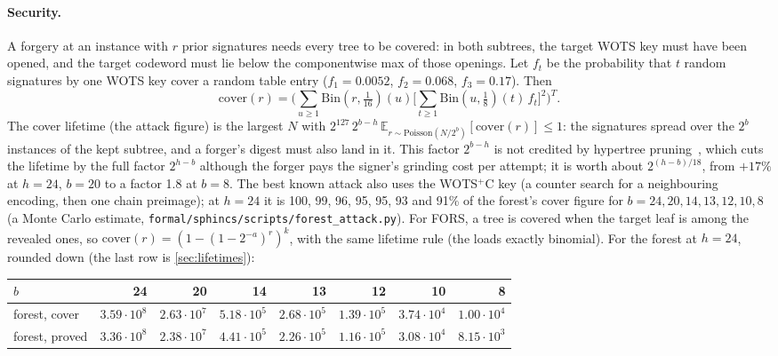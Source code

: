 \documentclass[11pt]{article}
\begin{document}
\paragraph{Security.} A forgery at an instance with $r$ prior signatures needs every tree to be covered: in both
subtrees, the target WOTS key must have been opened, and the target codeword must lie below the componentwise max of
those openings. Let $f_t$ be the probability that $t$ random signatures by one WOTS key cover a random table entry
($f_1=0.0052$, $f_2=0.068$, $f_3=0.17$). Then
\[
\mathrm{cover}(r)=\Big(\sum_{u\ge1}\mathrm{Bin}(r,\tfrac1{16})(u)\Big[\sum_{t\ge1}\mathrm{Bin}(u,\tfrac18)(t)\,f_t\Big]^2\Big)^T .
\]
The cover lifetime (the attack figure) is the largest $N$ with $2^{127}\,2^{b-h}\,\mathbb{E}_{r\sim\mathrm{Poisson}(N/2^b)}[\mathrm{cover}(r)]\le1$:
the signatures spread over the $2^b$ instances of the kept subtree, and a forger's digest must also land in it. This
factor $2^{b-h}$ is not credited by hypertree pruning~\cite{conduition}, which cuts the lifetime by the full factor
$2^{h-b}$ although the forger pays the signer's grinding cost per attempt; it is worth about $2^{(h-b)/18}$, from
$+17\%$ at $h=24$, $b=20$ to a factor 1.8 at $b=8$. The best known attack also uses the WOTS$^+$C key (a counter
search for a neighbouring encoding, then one chain preimage); at $h=24$ it is 100, 99, 96, 95, 95, 93 and 91\% of the
forest's cover figure for $b=24,20,14,13,12,10,8$ (a Monte Carlo estimate, \texttt{formal/sphincs/scripts/forest\_attack.py}). For FORS, a tree is covered when the target leaf
is among the revealed ones, so $\mathrm{cover}(r)=(1-(1-2^{-a})^r)^k$, with the same lifetime rule (the loads
exactly binomial). For the forest at $h=24$, rounded down (the last row is \cref{sec:lifetimes}):
\begin{center}
\setlength{\tabcolsep}{4.5pt}
\begin{tabular}{lrrrrrrr}
  \toprule
  $b$ & 24 & 20 & 14 & 13 & 12 & 10 & 8 \\
  \midrule
  forest, cover & $3.59\cdot10^8$ & $2.63\cdot10^7$ & $5.18\cdot10^5$ & $2.68\cdot10^5$ & $1.39\cdot10^5$ & $3.74\cdot10^4$ & $1.00\cdot10^4$ \\
  \midrule
  forest, proved & $3.36\cdot10^8$ & $2.38\cdot10^7$ & $4.41\cdot10^5$ & $2.26\cdot10^5$ & $1.16\cdot10^5$ & $3.08\cdot10^4$ & $8.15\cdot10^3$ \\
  \bottomrule
\end{tabular}
\end{center}
\end{document}
